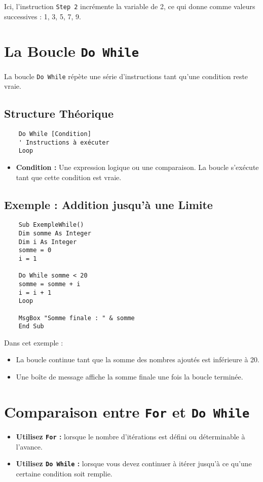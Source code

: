 \documentclass[a4paper,12pt]{report}
\begin{document}
Ici, l'instruction \texttt{Step 2} incrémente la variable de 2, ce qui donne comme valeurs successives : 1, 3, 5, 7, 9.

\section{La Boucle \texttt{Do While}}
La boucle \texttt{Do While} répète une série d'instructions tant qu'une condition reste vraie.

\subsection*{Structure Théorique}
\begin{lstlisting}
	Do While [Condition]
	' Instructions à exécuter
	Loop
\end{lstlisting}

\begin{itemize}
	\item \textbf{Condition :} Une expression logique ou une comparaison. La boucle s'exécute tant que cette condition est vraie.
\end{itemize}

\subsection*{Exemple : Addition jusqu'à une Limite}
\begin{lstlisting}
	Sub ExempleWhile()
	Dim somme As Integer
	Dim i As Integer
	somme = 0
	i = 1
	
	Do While somme < 20
	somme = somme + i
	i = i + 1
	Loop
	
	MsgBox "Somme finale : " & somme
	End Sub
\end{lstlisting}

Dans cet exemple :
\begin{itemize}
	\item La boucle continue tant que la somme des nombres ajoutés est inférieure à 20.
	\item Une boîte de message affiche la somme finale une fois la boucle terminée.
\end{itemize}

\section{Comparaison entre \texttt{For} et \texttt{Do While}}
\begin{itemize}
	\item \textbf{Utilisez \texttt{For} :} lorsque le nombre d'itérations est défini ou déterminable à l'avance.
	\item \textbf{Utilisez \texttt{Do While} :} lorsque vous devez continuer à itérer jusqu'à ce qu'une certaine condition soit remplie.
\end{itemize}
\newpage
\end{document}
